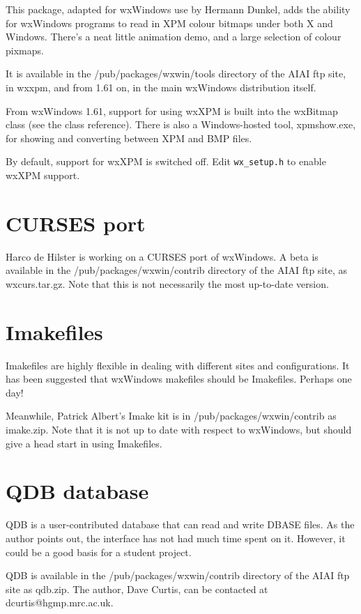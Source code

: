 This package, adapted for wxWindows use by Hermann Dunkel, adds the
ability for wxWindows programs to read in XPM colour bitmaps under both
X and Windows. There's a neat little animation demo, and a large selection of
colour pixmaps.

It is available in the /pub/packages/wxwin/tools directory of the AIAI ftp
site, in wxxpm, and from 1.61 on, in the main wxWindows distribution
itself.

From wxWindows 1.61, support for using wxXPM is built into the wxBitmap
class (see the class reference). There is also a Windows-hosted tool,
xpmshow.exe, for showing and converting between XPM and BMP files.

By default, support for wxXPM is switched off. Edit {\tt wx\_setup.h} to
enable wxXPM support.

\section{CURSES port}

Harco de Hilster is working on a CURSES port of wxWindows. A beta is
available in the /pub/packages/wxwin/contrib directory of the AIAI ftp site, as
wxcurs.tar.gz. Note that this is not necessarily the most up-to-date
version.

\section{Imakefiles}

Imakefiles are highly flexible in dealing with different sites
and configurations. It has been suggested that wxWindows
makefiles should be Imakefiles. Perhaps one day!

Meanwhile, Patrick Albert's Imake kit is in /pub/packages/wxwin/contrib
as imake.zip. Note that it is not up to date with respect
to wxWindows, but should give a head start in using Imakefiles.

\section{QDB database}

QDB is a user-contributed database that can read and write DBASE files.
As the author points out, the interface has not had much time spent on it.
However, it could be a good basis for a student project.

QDB is available in the /pub/packages/wxwin/contrib directory of the AIAI ftp site
as qdb.zip. The author, Dave Curtis, can be contacted at
dcurtis@hgmp.mrc.ac.uk.

